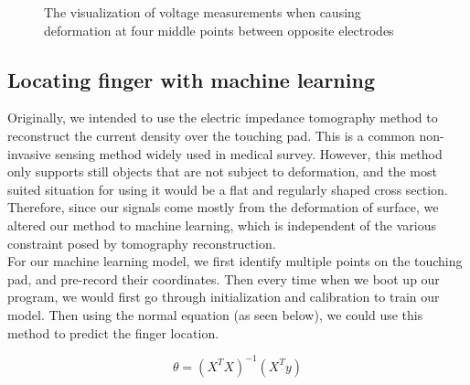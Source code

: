 \documentclass[reprint,amsmath, amsfonts, amssymb, aps, letterpaper]{revtex4-1}
\begin{document}
\begin{figure}
 	\caption{The visualization of voltage measurements when causing deformation at four middle points between opposite electrodes\label{fig::voltage_map}}
\end{figure}
 
\subsection{Locating finger with machine learning}
Originally, we intended to use the electric impedance tomography method to reconstruct the current density over the touching pad. This is a common non-invasive sensing method widely used in medical survey. However, this method only supports still objects that are not subject to deformation, and the most suited situation for using it would be a flat and regularly shaped cross section. Therefore, since our signals come mostly from the deformation of surface, we altered our method to machine learning, which is independent of the various constraint posed by tomography reconstruction.
\\\indent For our machine learning model, we first identify multiple points on the touching pad, and pre-record their coordinates. Then every time when we boot up our program, we would first go through initialization and calibration to train our model. Then using the normal equation (as seen below), we could use this method to predict the finger location.

\begin{equation}
 	\theta = (X^TX)^{-1}(X^Ty)
\end{equation}
\end{document}
